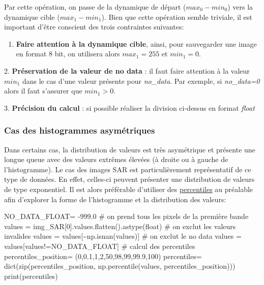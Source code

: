 \documentclass[
  french,
  11pt,
  letterpaper,
  open=any,
  twoside=false,
  french]{scrbook}
\newenvironment{Shaded}{\begin{snugshade}}{\end{snugshade}}
\newcommand{\BuiltInTok}[1]{\textcolor[rgb]{0.00,0.23,0.31}{#1}}
\newcommand{\CommentTok}[1]{\textcolor[rgb]{0.37,0.37,0.37}{#1}}
\newcommand{\DecValTok}[1]{\textcolor[rgb]{0.68,0.00,0.00}{#1}}
\newcommand{\FloatTok}[1]{\textcolor[rgb]{0.68,0.00,0.00}{#1}}
\newcommand{\NormalTok}[1]{\textcolor[rgb]{0.00,0.23,0.31}{#1}}
\newcommand{\OperatorTok}[1]{\textcolor[rgb]{0.37,0.37,0.37}{#1}}
\providecommand{\tightlist}{%
  \setlength{\itemsep}{0pt}\setlength{\parskip}{0pt}}
\begin{document}
Par cette opération, on passe de la dynamique de départ
(\(max_0 - min_0\)) vers la dynamique cible (\(max_1 - min_1\)). Bien
que cette opération semble triviale, il est important d'être conscient
des trois contraintes suivantes:

\begin{enumerate}
\def\labelenumi{\arabic{enumi}.}
\tightlist
\item
  \textbf{Faire attention à la dynamique cible}, ainsi, pour sauvegarder
  une image en format 8 bit, on utilisera alors \(max_1=255\) et
  \(min_1=0\).
\end{enumerate}

2. \textbf{Préservation de la valeur de no data} : il faut faire
attention à la valeur \(min_1\) dans le cas d'une valeur présente pour
\emph{no\_data}. Par exemple, si \emph{no\_data=0} alors il faut
s'assurer que \(min_1>0\).

3. \textbf{Précision du calcul} : si possible réaliser la division
ci-dessus en format \emph{float}

\subsubsection{Cas des histogrammes
asymétriques}\label{cas-des-histogrammes-asymuxe9triques}

Dans certains cas, la distribution de valeurs est très asymétrique et
présente une longue queue avec des valeurs extrêmes élevées (à droite ou
à gauche de l'histogramme). Le cas des images SAR est particulièrement
représentatif de ce type de données. En effet, celles-ci peuvent
présenter une distribution de valeurs de type exponentiel. Il est alors
préférable d'utiliser des
\href{https://fr.wikipedia.org/wiki/Centile}{percentiles} au préalable
afin d'explorer la forme de l'histogramme et la distribution des
valeurs:

\begin{Shaded}
\begin{Highlighting}[]
\NormalTok{NO\_DATA\_FLOAT}\OperatorTok{=} \OperatorTok{{-}}\FloatTok{999.0}
\CommentTok{\# on prend tous les pixels de la première bande}
\NormalTok{values }\OperatorTok{=}\NormalTok{ img\_SAR[}\DecValTok{0}\NormalTok{].values.flatten().astype(}\BuiltInTok{float}\NormalTok{)}
\CommentTok{\# on exclut les valeurs invalides}
\NormalTok{values }\OperatorTok{=}\NormalTok{ values[}\OperatorTok{\textasciitilde{}}\NormalTok{np.isnan(values)]}
\CommentTok{\# on exclut le no data}
\NormalTok{values }\OperatorTok{=}\NormalTok{ values[values}\OperatorTok{!=}\NormalTok{NO\_DATA\_FLOAT]}
\CommentTok{\# calcul des percentiles}
\NormalTok{percentiles\_position}\OperatorTok{=}\NormalTok{ (}\DecValTok{0}\NormalTok{,}\FloatTok{0.1}\NormalTok{,}\DecValTok{1}\NormalTok{,}\DecValTok{2}\NormalTok{,}\DecValTok{50}\NormalTok{,}\DecValTok{98}\NormalTok{,}\DecValTok{99}\NormalTok{,}\FloatTok{99.9}\NormalTok{,}\DecValTok{100}\NormalTok{)}
\NormalTok{percentiles}\OperatorTok{=} \BuiltInTok{dict}\NormalTok{(}\BuiltInTok{zip}\NormalTok{(percentiles\_position, np.percentile(values, percentiles\_position)))}
\BuiltInTok{print}\NormalTok{(percentiles)}
\end{Highlighting}
\end{Shaded}
\end{document}
